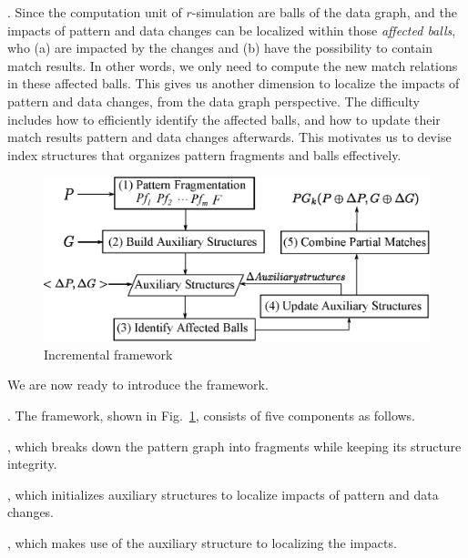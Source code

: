 .
Since the computation unit of $r$-simulation are balls of the data graph, and the impacts of pattern and data changes can be localized within those {\em affected balls}, who (a) are impacted by the changes and (b) have the possibility to contain match results. In other words, we only need to compute the new match relations in these affected balls. This gives us another dimension to localize the impacts of pattern and data changes, from the data graph perspective. The difficulty includes how to efficiently identify the affected balls, and how to update their match results \wrt pattern and data changes afterwards. This motivates us to devise index structures that organizes pattern fragments and balls effectively.


\begin{figure}[tb!]
\label{fig-framework}
\begin{center}
\includegraphics[scale=0.43]{./fig/inc-framework.eps}
\end{center}
\vspace{-3ex}
\caption{Incremental framework}
\vspace{-5ex}
\end{figure}

We are now ready to introduce the framework.

. The framework, shown in Fig.~\ref{fig-framework}, consists of five components as follows.

, which breaks down the pattern graph into fragments while keeping its structure integrity.

, which initializes auxiliary structures to localize impacts of pattern and data changes.

, which makes use of the auxiliary structure to localizing the impacts.

